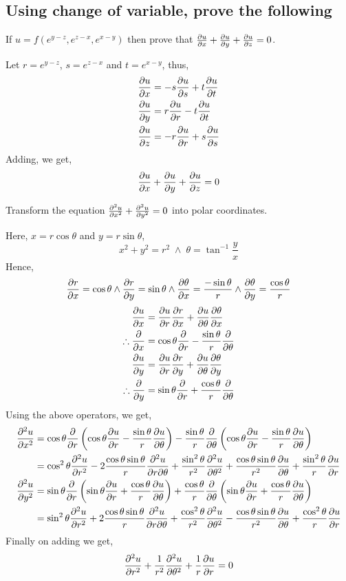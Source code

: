\subsection{Using change of variable, prove the following}
\begin{asign}
	If $u=f(e^{y-z},e^{z-x},e^{x-y})$ then prove that $\pdv{u}{x}+\pdv{u}{y}+\pdv{u}{z}=0$.
\end{asign}
\begin{anse}
	Let $r=e^{y-z}$, $s=e^{z-x}$ and $t=e^{x-y}$, thus,
	\[\begin{split}
		\pdv{u}{x}&=-s\pdv{u}{s}+t\pdv{u}{t}\\
		\pdv{u}{y}&=r\pdv{u}{r}-t\pdv{u}{t}\\
		\pdv{u}{z}&=-r\pdv{u}{r}+s\pdv{u}{s}
	\end{split}\]
	Adding, we get,
	\[\pdv{u}{x}+\pdv{u}{y}+\pdv{u}{z}=0\]
\end{anse}
\begin{asign}
	Transform the equation $\pdv[2]{u}{x}+\pdv[2]{u}{y}=0$ into polar coordinates.
\end{asign}
\begin{anse}
	Here, $x=r\cos\theta$ and $y=r\sin\theta$,
	\[x^2+y^2=r^2\;\land \; \theta=\tan^{-1}\frac{y}{x}\]
	Hence,
	\[\pdv{r}{x}=\cos\theta \land \pdv{r}{y}=\sin\theta\land \pdv{\theta}{x}=\frac{-\sin\theta}{r}\land \pdv{\theta}{y}=\frac{\cos\theta}{r}\]
	\[\begin{split}
		\pdv{u}{x}&=\pdv{u}{r}\pdv{r}{x}+\pdv{u}{\theta}\pdv{\theta}{x}\\
		\therefore \pdv{x}&=\cos\theta\pdv{r}-\frac{\sin\theta}{r}\pdv{\theta}\\
		\pdv{u}{y}&=\pdv{u}{r}\pdv{r}{y}+\pdv{u}{\theta}\pdv{\theta}{y}\\
		\therefore \pdv{y}&=\sin\theta\pdv{r}+\frac{\cos\theta}{r}\pdv{\theta}
	\end{split}\]
	Using the above operators, we get,
	\[\begin{split}
		\pdv[2]{u}{x}&=\cos\theta\pdv{r}\left( \cos\theta\pdv{u}{r}-\frac{\sin\theta}{r}\pdv{u}{\theta} \right)-\frac{\sin\theta}{r}\pdv{\theta} \left( \cos\theta\pdv{u}{r}-\frac{\sin\theta}{r}\pdv{u}{\theta}\right) \\
		&=\cos^2\theta\pdv[2]{u}{r}-2\frac{\cos\theta\sin\theta}{r}\pdv{u}{r}{\theta}+\frac{\sin^2\theta}{r^2}\pdv[2]{u}{\theta}+\frac{\cos\theta\sin\theta}{r^2}\pdv{u}{\theta}+\frac{\sin^2\theta}{r}\pdv{u}{r}\\
		\pdv[2]{u}{y}&=\sin\theta\pdv{r}\left( \sin\theta\pdv{u}{r}+\frac{\cos\theta}{r}\pdv{u}{\theta} \right)+\frac{\cos\theta}{r}\pdv{\theta} \left( \sin\theta\pdv{u}{r}+\frac{\cos\theta}{r}\pdv{u}{\theta}  \right)\\
		&=\sin^2\theta\pdv[2]{u}{r}+2\frac{\cos\theta\sin\theta}{r}\pdv{u}{r}{\theta}+\frac{\cos^2\theta}{r^2}\pdv[2]{u}{\theta}-\frac{\cos\theta\sin\theta}{r^2}\pdv{u}{\theta}+\frac{\cos^2\theta}{r}\pdv{u}{r}
	\end{split}\]
	Finally on adding we get,
	\[\pdv[2]{u}{r}+\frac{1}{r^2}\pdv[2]{u}{\theta}+\frac{1}{r}\pdv{u}{r}=0\]
\end{anse}
